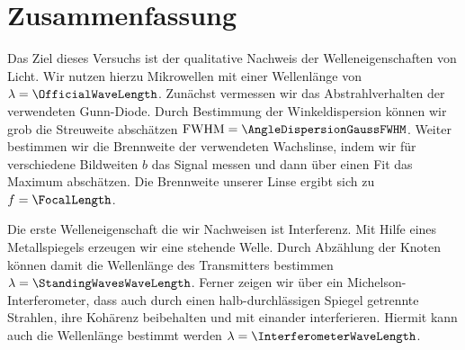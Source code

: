 \documentclass[a4paper,10pt,twocolumn]{article}
\begin{document}
    \section{Zusammenfassung}
    
    
    Das Ziel dieses Versuchs ist der qualitative Nachweis der Welleneigenschaften von Licht.
    Wir nutzen hierzu Mikrowellen mit einer Wellenlänge von $\lambda = \OfficialWaveLength$.
    Zunächst vermessen wir das Abstrahlverhalten der verwendeten Gunn-Diode. 
    Durch Bestimmung der Winkeldispersion können wir grob die Streuweite abschätzen $\mathrm{FWHM} = \AngleDispersionGaussFWHM$.
    Weiter bestimmen wir die Brennweite der verwendeten Wachslinse, indem wir für verschiedene
    Bildweiten $b$ das Signal messen und dann über einen Fit das Maximum abschätzen.
    Die Brennweite unserer Linse ergibt sich zu $f = \FocalLength$.
    
    Die erste Welleneigenschaft die wir Nachweisen ist Interferenz.
    Mit Hilfe eines Metallspiegels erzeugen wir eine stehende Welle.
    Durch Abzählung der Knoten können damit die Wellenlänge des Transmitters bestimmen $\lambda = \StandingWavesWaveLength$.
    Ferner zeigen wir über ein Michelson-Interferometer, dass auch durch einen halb-durchlässigen Spiegel getrennte Strahlen,
    ihre Kohärenz beibehalten und mit einander interferieren.
    Hiermit kann auch die Wellenlänge bestimmt werden $\lambda = \InterferometerWaveLength$.
    
\end{document}
